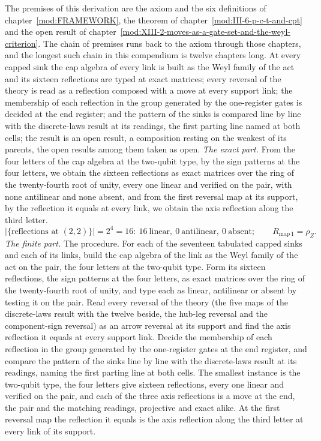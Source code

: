 \begin{chproof}
The premises of this derivation are the axiom and the six definitions of chapter~\ref{mod:FRAMEWORK}, the theorem of chapter~\ref{mod:III-6-p-c-t-and-cpt} and the open result of chapter~\ref{mod:XIII-2-moves-as-a-gate-set-and-the-weyl-criterion}. The chain of premises runs back to the axiom through those chapters, and the longest such chain in this compendium is twelve chapters long.
At every capped sink the cap algebra of every link is built as the Weyl family of the act and its sixteen reflections are typed at exact matrices; every reversal of the theory is read as a reflection composed with a move at every support link; the membership of each reflection in the group generated by the one-register gates is decided at the end register; and the pattern of the sinks is compared line by line with the discrete-laws result at its readings, the first parting line named at both cells; the result is an open result, a composition resting on the weakest of its parents, the open results among them taken as open.
\textit{The exact part.}
From the four letters of the cap algebra at the two-qubit type, by the sign patterns at the four letters, we obtain the sixteen reflections as exact matrices over the ring of the twenty-fourth root of unity, every one linear and verified on the pair, with none antilinear and none absent, and from the first reversal map at its support, by the reflection it equals at every link, we obtain the axis reflection along the third letter.
\begin{equation}
|\{\text{reflections at } (2,2)\}| = 2^{4} = 16: \ 16 \ \text{linear}, \ 0 \ \text{antilinear}, \ 0 \ \text{absent}; \qquad R_{\mathrm{map}\,1} = \rho_{Z} .
\end{equation}
\textit{The finite part.}
The procedure. For each of the seventeen tabulated capped sinks and each of its links, build the cap algebra of the link as the Weyl family of the act on the pair, the four letters at the two-qubit type. Form its sixteen reflections, the sign patterns at the four letters, as exact matrices over the ring of the twenty-fourth root of unity, and type each as linear, antilinear or absent by testing it on the pair. Read every reversal of the theory (the five maps of the discrete-laws result with the twelve beside, the hub-leg reversal and the component-sign reversal) as an arrow reversal at its support and find the axis reflection it equals at every support link. Decide the membership of each reflection in the group generated by the one-register gates at the end register, and compare the pattern of the sinks line by line with the discrete-laws result at its readings, naming the first parting line at both cells. The smallest instance is the two-qubit type, the four letters give sixteen reflections, every one linear and verified on the pair, and each of the three axis reflections is a move at the end, the pair and the matching readings, projective and exact alike. At the first reversal map the reflection it equals is the axis reflection along the third letter at every link of its support.

\end{chproof}
